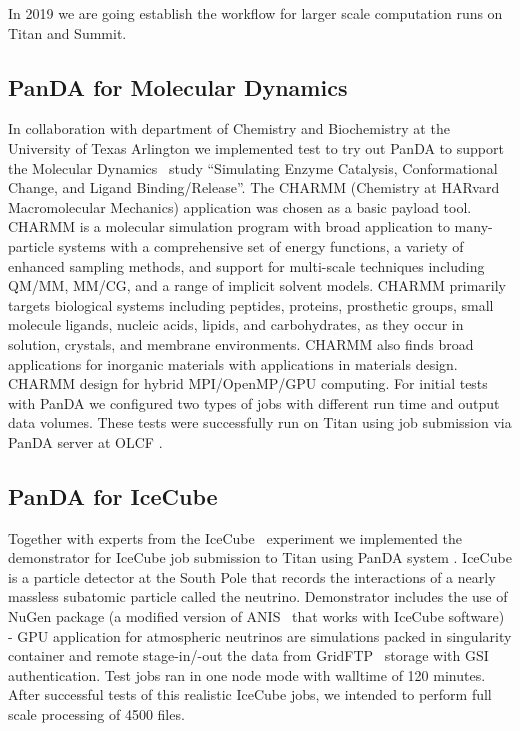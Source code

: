 \documentclass{webofc}
\begin{document}
In 2019 we are going establish the workflow for larger scale computation runs on Titan and Summit.

\subsection{PanDA for Molecular Dynamics}

In collaboration with department of Chemistry and Biochemistry at the University of Texas Arlington we implemented test to try out PanDA to support the Molecular Dynamics~\cite{3b6dad414e794d36954333f8f177f47c} study “Simulating Enzyme Catalysis, Conformational Change, and Ligand Binding/Release”. The CHARMM (Chemistry at HARvard Macromolecular Mechanics) application was chosen as a basic payload tool. CHARMM is a molecular simulation program with broad application to many-particle systems with a comprehensive set of energy functions, a variety of enhanced sampling methods, and support for multi-scale techniques including QM/MM, MM/CG, and a range of implicit solvent models. CHARMM primarily targets biological systems including peptides, proteins, prosthetic groups, small molecule ligands, nucleic acids, lipids, and carbohydrates, as they occur in solution, crystals, and membrane environments. CHARMM also finds broad applications for inorganic materials with applications in materials design. CHARMM design for hybrid MPI/OpenMP/GPU computing. For initial tests with PanDA we configured two types of jobs with different run time and output data volumes. These tests were successfully run on Titan using job submission via PanDA server at OLCF .


\subsection{PanDA for IceCube}

Together with experts from the IceCube~\cite{doi:10.1063/1.3480478} experiment we implemented the demonstrator for IceCube job submission to Titan using PanDA system . IceCube is a particle detector at the South Pole that records the interactions of a nearly massless subatomic particle called the neutrino. Demonstrator includes the use of NuGen package (a modified version of ANIS~\cite{GAZIZOV2005203} that works with IceCube software) - GPU application for atmospheric neutrinos are simulations packed in singularity container and remote stage-in/-out the data from GridFTP~\cite{GlobusGridFTP} storage with GSI authentication. Test jobs ran in one node mode with walltime of 120 minutes. After successful tests of this realistic IceCube jobs, we intended to perform full scale processing of 4500 files.
\end{document}
